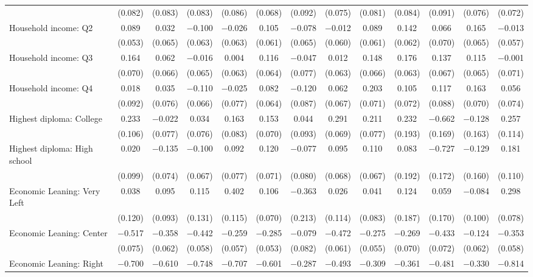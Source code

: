 \begin{tabular}{@{\extracolsep{5pt}}lcccccccccccc}
  & (0.082) & (0.083) & (0.083) & (0.086) & (0.068) & (0.092) & (0.075) & (0.081) & (0.084) & (0.091) & (0.076) & (0.072) \\ 
  Household income: Q2 & 0.089 & 0.032 & $-$0.100 & $-$0.026 & 0.105 & $-$0.078 & $-$0.012 & 0.089 & 0.142 & 0.066 & 0.165 & $-$0.013 \\ 
  & (0.053) & (0.065) & (0.063) & (0.063) & (0.061) & (0.065) & (0.060) & (0.061) & (0.062) & (0.070) & (0.065) & (0.057) \\ 
  Household income: Q3 & 0.164 & 0.062 & $-$0.016 & 0.004 & 0.116 & $-$0.047 & 0.012 & 0.148 & 0.176 & 0.137 & 0.115 & $-$0.001 \\ 
  & (0.070) & (0.066) & (0.065) & (0.063) & (0.064) & (0.077) & (0.063) & (0.066) & (0.063) & (0.067) & (0.065) & (0.071) \\ 
  Household income: Q4 & 0.018 & 0.035 & $-$0.110 & $-$0.025 & 0.082 & $-$0.120 & 0.062 & 0.203 & 0.105 & 0.117 & 0.163 & 0.056 \\ 
  & (0.092) & (0.076) & (0.066) & (0.077) & (0.064) & (0.087) & (0.067) & (0.071) & (0.072) & (0.088) & (0.070) & (0.074) \\ 
  Highest diploma: College & 0.233 & $-$0.022 & 0.034 & 0.163 & 0.153 & 0.044 & 0.291 & 0.211 & 0.232 & $-$0.662 & $-$0.128 & 0.257 \\ 
  & (0.106) & (0.077) & (0.076) & (0.083) & (0.070) & (0.093) & (0.069) & (0.077) & (0.193) & (0.169) & (0.163) & (0.114) \\ 
  Highest diploma: High school & 0.020 & $-$0.135 & $-$0.100 & 0.092 & 0.120 & $-$0.077 & 0.095 & 0.110 & 0.083 & $-$0.727 & $-$0.129 & 0.181 \\ 
  & (0.099) & (0.074) & (0.067) & (0.077) & (0.071) & (0.080) & (0.068) & (0.067) & (0.192) & (0.172) & (0.160) & (0.110) \\ 
  Economic Leaning: Very Left & 0.038 & 0.095 & 0.115 & 0.402 & 0.106 & $-$0.363 & 0.026 & 0.041 & 0.124 & 0.059 & $-$0.084 & 0.298 \\ 
  & (0.120) & (0.093) & (0.131) & (0.115) & (0.070) & (0.213) & (0.114) & (0.083) & (0.187) & (0.170) & (0.100) & (0.078) \\ 
  Economic Leaning: Center & $-$0.517 & $-$0.358 & $-$0.442 & $-$0.259 & $-$0.285 & $-$0.079 & $-$0.472 & $-$0.275 & $-$0.269 & $-$0.433 & $-$0.124 & $-$0.353 \\ 
  & (0.075) & (0.062) & (0.058) & (0.057) & (0.053) & (0.082) & (0.061) & (0.055) & (0.070) & (0.072) & (0.062) & (0.058) \\ 
  Economic Leaning: Right & $-$0.700 & $-$0.610 & $-$0.748 & $-$0.707 & $-$0.601 & $-$0.287 & $-$0.493 & $-$0.309 & $-$0.361 & $-$0.481 & $-$0.330 & $-$0.814 \\ 

\end{tabular}
